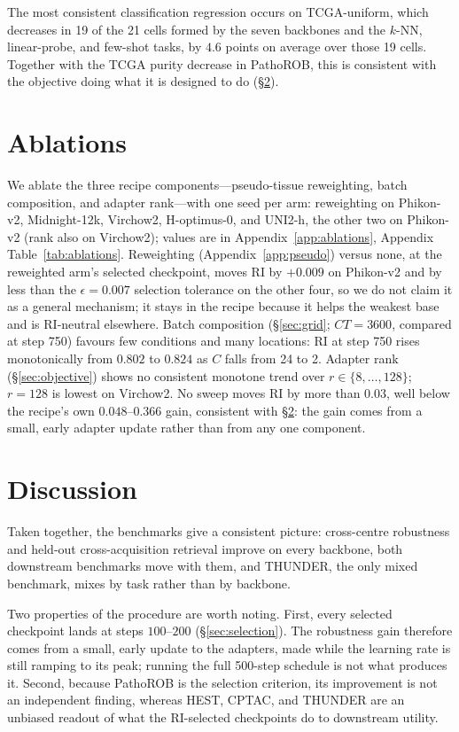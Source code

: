 \documentclass{article}
\begin{document}
The most consistent classification regression occurs on TCGA-uniform, which decreases in 19 of the 21 cells formed by the seven backbones and the $k$-NN, linear-probe, and few-shot tasks, by $4.6$ points on average over those 19 cells. Together with the TCGA purity decrease in PathoROB, this is consistent with the objective doing what it is designed to do (\S\ref{sec:discussion}).


\section{Ablations}
\label{sec:ablations}

We ablate the three recipe components---pseudo-tissue reweighting, batch composition, and adapter
rank---with one seed per arm: reweighting on Phikon-v2, Midnight-12k, Virchow2, H-optimus-0, and
UNI2-h, the other two on Phikon-v2 (rank also on Virchow2); values are in
Appendix~\ref{app:ablations}, Appendix Table~\ref{tab:ablations}. Reweighting
(Appendix~\ref{app:pseudo}) versus none, at the reweighted arm's selected checkpoint, moves RI by
$+0.009$ on Phikon-v2 and by less than the $\epsilon=0.007$ selection tolerance on the other four,
so we do not claim it as a general mechanism; it stays in the recipe because it helps the weakest
base and is RI-neutral elsewhere. Batch composition
(\S\ref{sec:grid}; $CT=3600$, compared at step 750) favours few conditions and many locations: RI at step 750
rises monotonically from $0.802$ to $0.824$ as $C$ falls from 24 to 2. Adapter rank
(\S\ref{sec:objective}) shows no consistent monotone trend over $r\in\{8,\ldots,128\}$; $r=128$ is lowest on
Virchow2. No sweep moves RI by more than $0.03$, well below the recipe's own
$0.048$--$0.366$ gain, consistent with \S\ref{sec:discussion}: the gain comes from a small, early
adapter update rather than from any one component.

\section{Discussion}
\label{sec:discussion}

Taken together, the benchmarks give a consistent picture: cross-centre robustness and held-out
cross-acquisition retrieval improve on every backbone, both downstream benchmarks move with them,
and THUNDER, the only mixed benchmark, mixes by task rather than by backbone.

Two properties of the procedure are worth noting. First, every selected checkpoint lands at steps
$100$--$200$ (\S\ref{sec:selection}). The robustness gain therefore comes from a small, early
update to the adapters, made while the learning rate is still ramping to its peak; running the
full 500-step schedule is not what produces it. Second, because PathoROB is the selection criterion, its improvement is not an independent
finding, whereas HEST, CPTAC, and THUNDER are an unbiased readout of
what the RI-selected checkpoints do to downstream utility.
\end{document}
